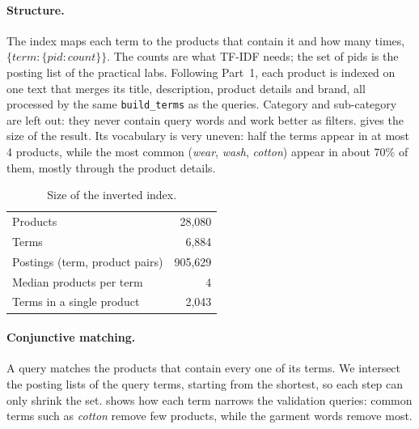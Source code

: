 \documentclass[11pt,a4paper]{article}
\begin{document}
\paragraph{Structure.} The index maps each term to the products that contain
it and how many times, $\{\mathit{term}: \{\mathit{pid}: \mathit{count}\}\}$.
The counts are what TF-IDF needs; the set of pids is the posting list of the
practical labs. Following Part~1, each product is indexed on one text that
merges its title, description, product details and brand, all processed by
the same \texttt{build\_terms} as the queries. Category and sub-category are
left out: they never contain query words and work better as filters.
 gives the size of the result. Its vocabulary is very uneven:
half the terms appear in at most 4 products, while the most common
(\emph{wear}, \emph{wash}, \emph{cotton}) appear in about 70\% of them, mostly
through the product details.

\begin{table}[htbp]
  \centering
  \caption{Size of the inverted index.}
  \label{tab:index}
  \begin{tabular}{lr}
    \toprule
    Products & 28{,}080 \\
    Terms & 6{,}884 \\
    Postings (term, product pairs) & 905{,}629 \\
    Median products per term & 4 \\
    Terms in a single product & 2{,}043 \\
    \bottomrule
  \end{tabular}
\end{table}

\paragraph{Conjunctive matching.} A query matches the products that contain
every one of its terms. We intersect the posting lists of the query terms,
starting from the shortest, so each step can only shrink the set.
 shows how each term narrows the validation queries: common terms
such as \emph{cotton} remove few products, while the garment words remove most.
\end{document}
